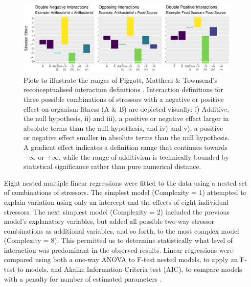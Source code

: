 \documentclass[final,1p,times]{elsarticle}
\begin{document}
\begin{figure}[H]
    \centering
    \includegraphics[width = \textwidth]{Scripts/Results/Plot_Interactions_Illustrative.pdf}
    \caption{Plots to illustrate the ranges of Piggott, Mattheai \& Townsend's reconceptualised interaction definitions \cite{Piggott2015}. Interaction definitions for three possible combinations of stressors with a negative or positive effect on organism fitness (A \& B) are depicted visually: i) Additive, the null hypothesis, ii) and iii), a positive or negative effect larger in absolute terms than the null hypothesis, and iv) and v), a positive or negative effect smaller in absolute terms than the null hypothesis.  A gradient effect indicates a definition range that continues towards $-\infty$ or $+\infty$, while the range of additivism is technically bounded by statistical significance rather than pure numerical distance.}
    \label{fig:interaction_ranges}
\end{figure}

Eight nested multiple linear regressions were fitted to the data using a nested set of combinations of stressors. The simplest model (Complexity = 1) attempted to explain variation using only an intercept and the effects of eight individual stressors. The next simplest model (Complexity = 2) included the previous model's explanatory variables, but added all possible two-way stressor combinations as additional variables, and so forth, to the most complex model (Complexity = 8). This permitted us to determine statistically what level of interaction was predominant in the observed results. Linear regressions were compared using both a one-way ANOVA to F-test nested models, to apply an F-test to models, and Akaike Information Criteria test (AIC), to compare models with a penalty for number of estimated parameters \cite{Akaike1974}. 
\end{document}
